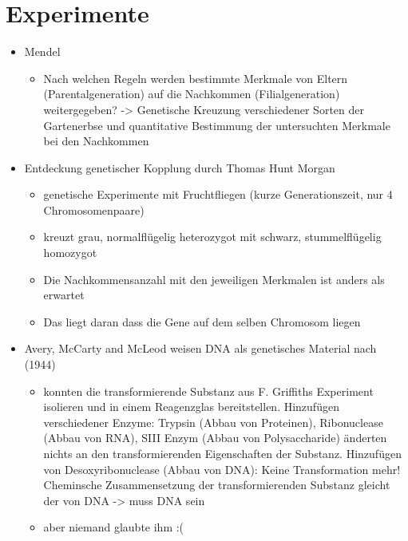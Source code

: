 \documentclass{article}
\begin{document}
\newpage

\section{Experimente}

\begin{itemize}

    \item Mendel
        \begin{itemize}
            \item Nach welchen Regeln werden bestimmte Merkmale von Eltern (Parentalgeneration) auf die Nachkommen (Filialgeneration) weitergegeben? -> Genetische Kreuzung verschiedener Sorten der Gartenerbse und quantitative Bestimmung der untersuchten Merkmale bei den Nachkommen
        \end{itemize}        
        
    \item Entdeckung genetischer Kopplung durch Thomas Hunt Morgan 
        \begin{itemize}
            \item genetische Experimente mit Fruchtfliegen (kurze Generationszeit, nur 4 Chromosomenpaare)
            \item kreuzt grau, normalflügelig heterozygot mit schwarz, stummelflügelig homozygot
            \item Die Nachkommensanzahl mit den jeweiligen Merkmalen ist anders als erwartet
            \item Das liegt daran dass die Gene auf dem selben Chromosom liegen
        \end{itemize}   

    \item Avery, McCarty and McLeod weisen DNA als genetisches Material nach (1944)
        \begin{itemize}
            \item konnten die transformierende Substanz aus F. Griffiths Experiment isolieren und in einem Reagenzglas bereitstellen. Hinzufügen verschiedener Enzyme: Trypsin (Abbau von Proteinen), Ribonuclease (Abbau von RNA), SIII Enzym (Abbau von Polysaccharide) änderten nichts an den transformierenden Eigenschaften der Substanz. Hinzufügen von Desoxyribonuclease (Abbau von DNA): Keine Transformation mehr! Cheminsche Zusammensetzung der transformierenden Substanz gleicht der von DNA -> muss DNA sein
            \item aber niemand glaubte ihm :(
        \end{itemize} 


\end{itemize}
\end{document}
